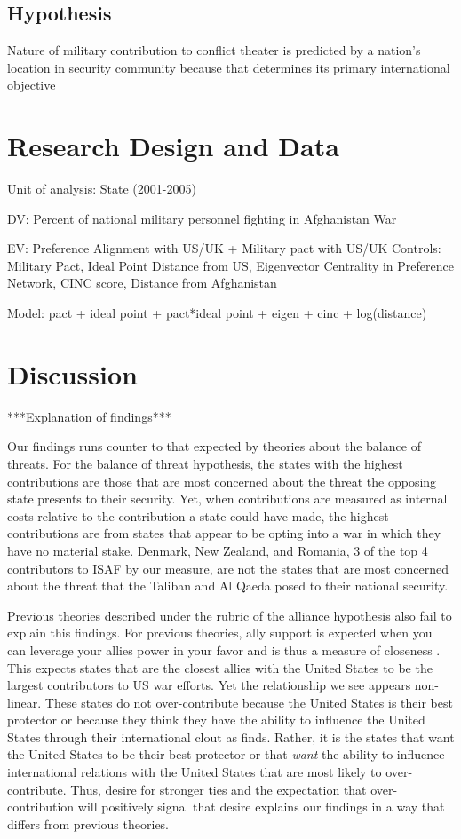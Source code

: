 \documentclass[12pt,letterpaper]{article}
\begin{document}
	\subsection{Hypothesis}
		Nature of military contribution to conflict theater is predicted by a nation's location in security community because that determines its primary international objective		

\section{Research Design and Data}
	Unit of analysis: State (2001-2005)
	
	DV: Percent of national military personnel fighting in Afghanistan War
	
	EV: Preference Alignment with US/UK + Military pact with US/UK
	Controls: Military Pact, Ideal Point Distance from US,  Eigenvector Centrality in Preference Network, CINC score, Distance from Afghanistan
	
	Model: pact + ideal point + pact*ideal point + eigen + cinc + log(distance)

\section{Discussion}

	***Explanation of findings***
		
	Our findings runs counter to that expected by theories about the balance of threats. For the balance of threat hypothesis, the states with the highest contributions are those that are most concerned about the threat the opposing state presents to their security. Yet, when contributions are measured as internal costs relative to the contribution a state could have made, the highest contributions are from states that appear to be opting into a war in which they have no material stake. Denmark, New Zealand, and Romania, 3 of the top 4 contributors to ISAF by our measure, are not the states that are most concerned about the threat that the Taliban and Al Qaeda posed to their national security.
		
	Previous theories described under the rubric of the alliance hypothesis also fail to explain this findings. For previous theories, ally support is expected when you can leverage your allies power in your favor and is thus a measure of closeness \citep{davidson_neoclassicalrealistexplanation_2011}. This expects states that are the closest allies with the United States to be the largest contributors to US war efforts. Yet the relationship we see appears non-linear. These states do not over-contribute because the United States is their best protector or because they think they have the ability to influence the United States through their international clout as \citet{ringsmose_natoburdensharingredux_2010} finds. Rather, it is the states that want the United States to be their best protector or that \textit{want} the ability to influence international relations with the United States that are most likely to over-contribute. Thus, desire for stronger ties and the expectation that over-contribution will positively signal that desire explains our findings in a way that differs from previous theories.
\end{document}
